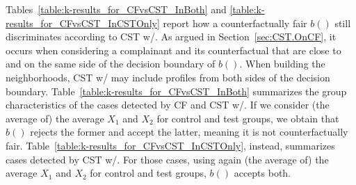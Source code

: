 Tables~\ref{table:k-results_for_CFvsCST_InBoth} and \ref{table:k-results_for_CFvsCST_InCSTOnly} report how a counterfactually fair $b()$ still discriminates according to CST w/.
As argued in Section~\ref{sec:CST.OnCF}, it occurs when considering a complainant and its counterfactual that are close to and on the same side of the decision boundary of $b()$.
When building the neighborhoods, CST w/ may include profiles from both sides of the decision boundary.
Table~\ref{table:k-results_for_CFvsCST_InBoth} summarizes the group characteristics of the cases detected by CF and CST w/.
If we consider (the average of) the average $X_1$ and $X_2$ for control and test groups, we obtain that $b()$ rejects the former and accept the latter, meaning it is not counterfactually fair.
Table~\ref{table:k-results_for_CFvsCST_InCSTOnly}, instead, summarizes cases detected by CST w/. 
For those cases, using again (the average of) the average $X_1$ and $X_2$ for control and test groups, $b()$ accepts both.

